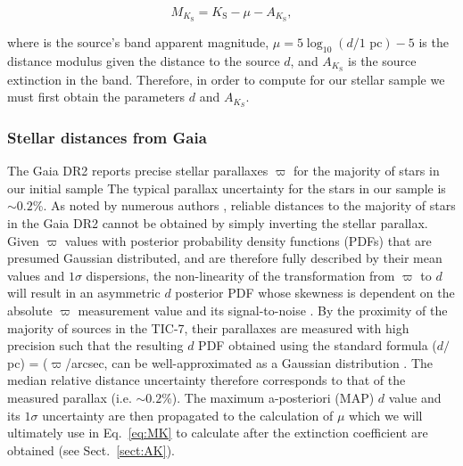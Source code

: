 \begin{equation}
  M_{K_{\text{S}}} = K_{\text{S}} - \mu - A_{K_{\text{S}}}, \label{eq:MK}
\end{equation}

\noindent where \Ks{} is the source's \Ks{-}band apparent magnitude, $\mu = 5\log_{10}{(d/\text{1 pc})} - 5$
is the distance modulus given the distance to the source $d$, and $A_{K_{\text{S}}}$ is the source extinction in the
\Ks{-}band. Therefore, in order to compute \MK{} for our stellar sample we must first obtain the parameters $d$ and
$A_{K_S}$.

\subsubsection{Stellar distances from Gaia}
The Gaia DR2 reports precise stellar parallaxes $\varpi$ for the majority of stars in our initial sample
The typical parallax uncertainty for the stars in our sample is $\sim 0.2$\%.
As noted by numerous authors \citep[e.g.][]{bailorjones15,astraatmadja16,luri18}, reliable distances to the
majority of stars in the Gaia DR2 cannot be obtained by simply inverting the stellar parallax. Given $\varpi$
values with posterior probability density functions (PDFs) that are presumed Gaussian distributed, and are
therefore fully described by their mean values and $1\sigma$ dispersions, the non-linearity
of the transformation from $\varpi$ to $d$ will result in an asymmetric $d$ posterior PDF whose skewness
is dependent on the absolute $\varpi$ measurement value and its signal-to-noise \citep{luri18}.
By the proximity of the majority of sources in the TIC-7, their parallaxes are measured with high precision such
that the resulting $d$ PDF obtained using the standard formula ($d/$ pc) = ($\varpi$/arcsec, can be well-approximated
as a Gaussian distribution \citep{bailorjones18}. The median relative distance uncertainty therefore corresponds to 
that of the measured parallax (i.e. $\sim 0.2$\%). The maximum a-posteriori (MAP) $d$ value and its $1\sigma$
uncertainty are then propagated to the calculation of $\mu$ which we will ultimately use in Eq.~\ref{eq:MK} to
calculate \MK{} after the extinction coefficient are obtained (see Sect.~\ref{sect:AK}). \\


